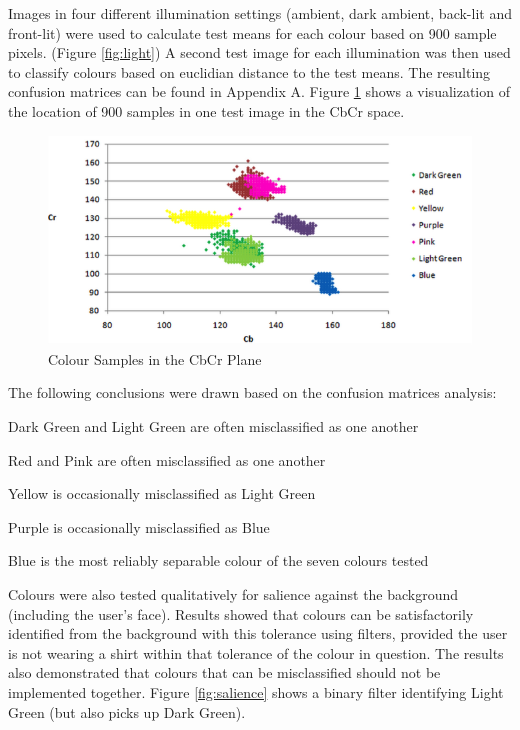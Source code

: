 \documentclass[12pt]{article}
\begin{document}
Images in four different illumination settings (ambient, dark ambient, back-lit and front-lit) were used to calculate test means for each colour based on 900 sample pixels. (Figure \ref{fig:light}) A second test image for each illumination was then used to classify colours based on euclidian distance to the test means. The resulting confusion matrices can be found in Appendix A. Figure \ref{fig:YUVTest} shows a visualization of the location of 900 samples in one test image in the CbCr space. 

\begin{figure}[h]
  \centering
  \includegraphics[scale=1]{YUVTest.png}
  \caption{Colour Samples in the CbCr Plane}
  \label{fig:YUVTest}
\end{figure}

The following conclusions were drawn based on the confusion matrices analysis: 
\begin{enumerate*}
	\item Dark Green and Light Green are often misclassified as one another 
	\item Red and Pink are often misclassified as one another
	\item Yellow is occasionally misclassified as Light Green
	\item Purple is occasionally misclassified as Blue
	\item Blue is the most reliably separable colour of the seven colours tested
\end{enumerate*}

Colours were also tested qualitatively for salience against the background (including the user’s face). Results showed that colours can be satisfactorily identified from the background with this tolerance using filters, provided the user is not wearing a shirt within that tolerance of the colour in question. The results also demonstrated that colours that can be misclassified should not be implemented together. Figure \ref{fig:salience} shows a binary filter identifying Light Green (but also picks up Dark Green). 
\end{document}
